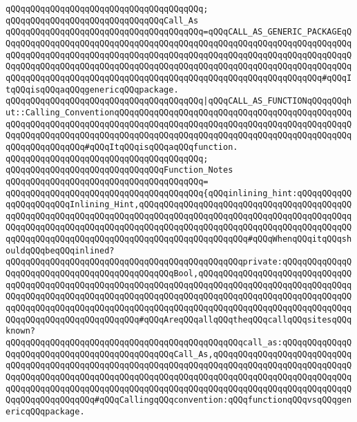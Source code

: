\verb|qQQqqQQqqQQqqQQqqQQqqQQqqQQqqQQqqQQqqQQq;|\newline
\newline
\verb|qQQqqQQqqQQqqQQqqQQqqQQqqQQqqQQqCall_As|\newline
\verb|qQQqqQQqqQQqqQQqqQQqqQQqqQQqqQQqqQQqqQQq=qQQqCALL_AS_GENERIC_PACKAGEqQQqqQQqqQQqqQQqqQQqqQQqqQQqqQQqqQQqqQQqqQQqqQQqqQQqqQQqqQQqqQQqqQQqqQQqqQQqqQQqqQQqqQQqqQQqqQQqqQQqqQQqqQQqqQQqqQQqqQQqqQQqqQQqqQQqqQQqqQQqqQQqqQQqqQQqqQQqqQQqqQQqqQQqqQQqqQQqqQQqqQQqqQQqqQQqqQQqqQQqqQQqqQQqqQQqqQQqqQQqqQQqqQQqqQQqqQQqqQQqqQQqqQQqqQQqqQQqqQQqqQQqqQQqqQQqqQQq#qQQqItqQQqisqQQqaqQQqgenericqQQqpackage.|\newline
\verb|qQQqqQQqqQQqqQQqqQQqqQQqqQQqqQQqqQQqqQQq|\verb#|qQQqCALL_AS_FUNCTIONqQQqqQQqhut::Calling_ConventionqQQqqQQqqQQqqQQqqQQqqQQqqQQqqQQqqQQqqQQqqQQqqQQqqQQqqQQqqQQqqQQqqQQqqQQqqQQqqQQqqQQqqQQqqQQqqQQqqQQqqQQqqQQqqQQqqQQqqQQqqQQqqQQqqQQqqQQqqQQqqQQqqQQqqQQqqQQqqQQqqQQqqQQqqQQqqQQqqQQqqQQqqQQqqQQqqQQqqQQqqQQq#\verb|#qQQqItqQQqisqQQqaqQQqfunction.|\newline
\verb|qQQqqQQqqQQqqQQqqQQqqQQqqQQqqQQqqQQqqQQq;|\newline
\newline
\verb|qQQqqQQqqQQqqQQqqQQqqQQqqQQqqQQqFunction_Notes|\newline
\verb|qQQqqQQqqQQqqQQqqQQqqQQqqQQqqQQqqQQqqQQq=|\newline
\verb|qQQqqQQqqQQqqQQqqQQqqQQqqQQqqQQqqQQqqQQq{qQQqinlining_hint:qQQqqQQqqQQqqQQqqQQqqQQqInlining_Hint,qQQqqQQqqQQqqQQqqQQqqQQqqQQqqQQqqQQqqQQqqQQqqQQqqQQqqQQqqQQqqQQqqQQqqQQqqQQqqQQqqQQqqQQqqQQqqQQqqQQqqQQqqQQqqQQqqQQqqQQqqQQqqQQqqQQqqQQqqQQqqQQqqQQqqQQqqQQqqQQqqQQqqQQqqQQqqQQqqQQqqQQqqQQqqQQqqQQqqQQqqQQqqQQqqQQqqQQqqQQqqQQqqQQqqQQq#qQQqWhenqQQqitqQQqshouldqQQqbeqQQqinlined?|\newline
\verb|qQQqqQQqqQQqqQQqqQQqqQQqqQQqqQQqqQQqqQQqqQQqqQQqprivate:qQQqqQQqqQQqqQQqqQQqqQQqqQQqqQQqqQQqqQQqqQQqqQQqBool,qQQqqQQqqQQqqQQqqQQqqQQqqQQqqQQqqQQqqQQqqQQqqQQqqQQqqQQqqQQqqQQqqQQqqQQqqQQqqQQqqQQqqQQqqQQqqQQqqQQqqQQqqQQqqQQqqQQqqQQqqQQqqQQqqQQqqQQqqQQqqQQqqQQqqQQqqQQqqQQqqQQqqQQqqQQqqQQqqQQqqQQqqQQqqQQqqQQqqQQqqQQqqQQqqQQqqQQqqQQqqQQqqQQqqQQqqQQqqQQqqQQqqQQqqQQqqQQqqQQqqQQqqQQq#qQQqAreqQQqallqQQqtheqQQqcallqQQqsitesqQQqknown?|\newline
\verb|qQQqqQQqqQQqqQQqqQQqqQQqqQQqqQQqqQQqqQQqqQQqqQQqcall_as:qQQqqQQqqQQqqQQqqQQqqQQqqQQqqQQqqQQqqQQqqQQqqQQqCall_As,qQQqqQQqqQQqqQQqqQQqqQQqqQQqqQQqqQQqqQQqqQQqqQQqqQQqqQQqqQQqqQQqqQQqqQQqqQQqqQQqqQQqqQQqqQQqqQQqqQQqqQQqqQQqqQQqqQQqqQQqqQQqqQQqqQQqqQQqqQQqqQQqqQQqqQQqqQQqqQQqqQQqqQQqqQQqqQQqqQQqqQQqqQQqqQQqqQQqqQQqqQQqqQQqqQQqqQQqqQQqqQQqqQQqqQQqqQQqqQQqqQQqqQQqqQQqqQQq#qQQqCallingqQQqconvention:qQQqfunctionqQQqvsqQQqgenericqQQqpackage.|\newline
